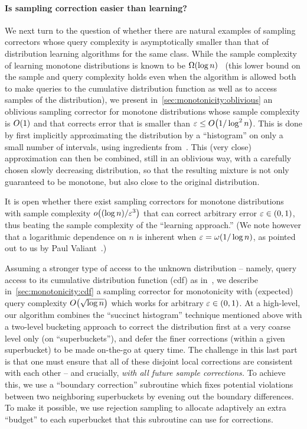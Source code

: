 \paragraph{Is sampling correction easier than learning?}
We next turn to the question of whether there are natural examples of sampling correctors whose query complexity is
asymptotically smaller 
than that of distribution learning algorithms for the same class. 
While the sample complexity of learning monotone 
distributions is known to be $\bigOmega{\log{n}}$~\cite{Birge:87} 
(this lower bound on the sample and query complexity
holds even when the algorithm is allowed both to make
queries to the cumulative distribution function
as well as to access samples of the distribution), 
we present in~\autoref{sec:monotonicity:oblivious} an oblivious sampling corrector for 
monotone distributions whose sample complexity is $\bigO{1}$ {and} that corrects error that is smaller than $\eps \leq \bigO{1/\log^2{n}}$. 
This is done by first implicitly approximating the distribution by a ``histogram'' on only a small number of intervals, 
using ingredients from~\cite{Birge:87}. 
This (very close) approximation can 
then be combined, still in an oblivious way, with a carefully chosen slowly decreasing distribution, so that the resulting 
mixture is not only guaranteed to be monotone, but also close to the original distribution.

It is open whether there exist sampling correctors for monotone distributions
with sample complexity $\littleO{(\log n)/\eps^3}$ that can correct arbitrary error $\varepsilon\in(0,1)$, thus beating the sample complexity of the ``learning approach.'' (We note however that a logarithmic dependence on $n$ is inherent {when $\varepsilon = \omega(1/\log n)$}, as pointed out to us by Paul Valiant~\cite{Val:15:sketch}.)

Assuming a stronger type of access to the unknown distribution -- namely, query access to its cumulative distribution function (cdf) as in~\cite{BDKR:05,CR:14}, we 
describe in~\autoref{sec:monotonicity:cdf} a sampling corrector for monotonicity with (expected) query complexity $\bigO{\sqrt{\log n}}$ {which works for arbitrary $\varepsilon\in(0,1)$}. At a high-level, our 
algorithm combines the ``succinct histogram'' technique mentioned above with a two-level bucketing approach to correct the distribution first at a very coarse level 
only (on ``superbuckets''), 
and defer the finer corrections (within a given superbucket) to be made on-the-go at query time. 
The challenge in this last part is that
one must ensure that all of these disjoint local 
 corrections are consistent with each other -- 
and crucially, \emph{with all future sample corrections.} 
 {To achieve this, we use a ``boundary correction'' subroutine which fixes potential violations between two neighboring superbuckets by evening out the boundary differences. To make it possible, we use rejection sampling to allocate adaptively an extra ``budget'' to each superbucket that this subroutine can use for corrections.}


